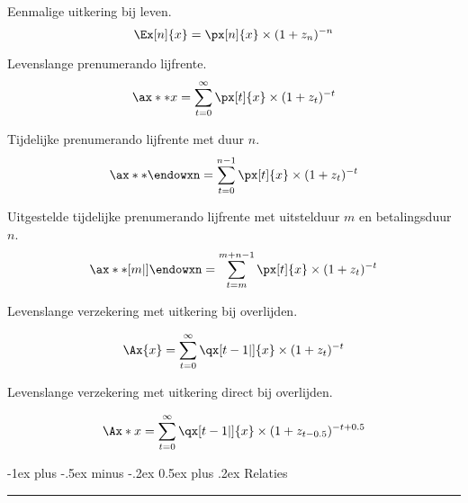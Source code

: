 \documentclass[10pt,landscape]{article}
\makeatletter
\renewcommand{\section}{\@startsection{section}{1}{0mm}%
                                {-1ex plus -.5ex minus -.2ex}%
                                {0.5ex plus .2ex}%
                                {\normalfont\large\bfseries}}
\makeatother
\begin{document}
\begin{multicols}{3}
Eenmalige uitkering bij leven.
$$ \Ex[n]{x} = \px[n]{x} \times (1 + z_{n})^{-n} $$

Levenslange prenumerando lijfrente.
$$ \ax**{x} = \sum_{t=0}^{\infty} \px[t]{x} \times (1 + z_{t})^{-t} $$

Tijdelijke prenumerando lijfrente met duur $n$.
$$ \ax**{\endowxn} = \sum_{t=0}^{n-1} \px[t]{x} \times (1 + z_{t})^{-t} $$

Uitgestelde tijdelijke prenumerando lijfrente met uitstelduur $m$ en betalingsduur $n$.
$$ \ax**[m|]{\endowxn} = \sum_{t=m}^{m+n-1} \px[t]{x} \times (1 + z_{t})^{-t} $$

Levenslange verzekering met uitkering bij overlijden.

$$ \Ax{x} = \sum_{t=0}^{\infty} \qx[t-1|]{x} \times (1 + z_{t})^{-t} $$

Levenslange verzekering met uitkering direct bij overlijden.

$$ \Ax*{x} = \sum_{t=0}^{\infty} \qx[t-1|]{x} \times (1 + z_{t-0.5})^{-t+0.5} $$

\section{Relaties}


\rule{0.3\linewidth}{0.25pt}
\scriptsize
\end{multicols}
\end{document}
